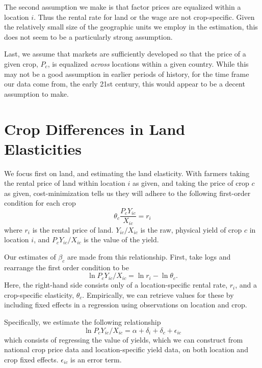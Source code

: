 \documentclass[10pt]{article}
\begin{document}
The second assumption we make is that factor prices are equalized within a location $i$. Thus the rental rate for land or the wage are not crop-specific. Given the relatively small size of the geographic units we employ in the estimation, this does not seem to be a particularly strong assumption.

Last, we assume that markets are sufficiently developed so that the price of a given crop, $P_c$, is equalized \textit{across} locations within a given country. While this may not be a good assumption in earlier periods of history, for the time frame our data come from, the early 21st century, this would appear to be a decent assumption to make. 

\section{Crop Differences in Land Elasticities}
We focus first on land, and estimating the land elasticity. With farmers taking the rental price of land within location $i$ as given, and taking the price of crop $c$ as given, cost-minimization tells us they will adhere to the following first-order condition for each crop
\begin{equation}
	\theta_c \frac{P_c Y_{ic}}{X_{ic}} = r_i
\end{equation}
where $r_i$ is the rental price of land. $Y_{ic}/X_{ic}$ is the raw, physical yield of crop $c$ in location $i$, and $P_c Y_{ic}/X_{ic}$ is the value of the yield.

Our estimates of $\beta_c$ are made from this relationship. First, take logs and rearrange the first order condition to be
\begin{equation}
	\ln P_c Y_{ic}/X_{ic} = \ln r_i - \ln \theta_c. 
\end{equation}
Here, the right-hand side consists only of a location-specific rental rate, $r_i$, and a crop-specific elasticity, $\theta_c$. Empirically, we can retrieve values for these by including fixed effects in a regression using observations on location and crop.

Specifically, we estimate the following relationship
\begin{equation}
	\ln P_c Y_{ic}/X_{ic} = \alpha + \delta_i + \delta_c + \epsilon_{ic}
\end{equation}
which consists of regressing the value of yields, which we can construct from national crop price data and location-specific yield data, on both location and crop fixed effects. $\epsilon_{ic}$ is an error term.
\end{document}
